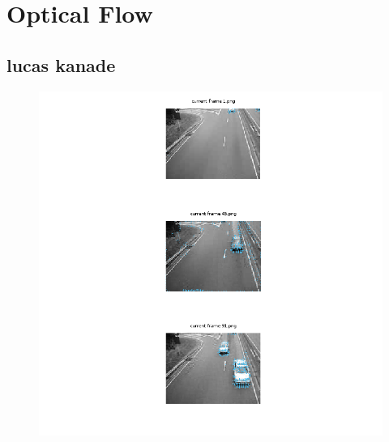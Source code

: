 \documentclass{article}
\begin{document}
	
	\section{Optical Flow}
	
	\subsection{lucas kanade}
	\begin{figure}[H]
		\includegraphics[width=\linewidth]{Q4/partA/partA.png}
	\end{figure}
	
\end{document}
